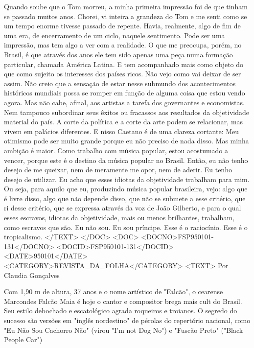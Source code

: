 Quando soube que o Tom morreu, a minha primeira impressão foi de que tinham se passado muitos anos. Chorei, vi inteira a grandeza do Tom e me senti como se um tempo enorme tivesse passado de repente. Havia, realmente, algo de fim de uma era, de encerramento de um ciclo, naquele sentimento. Pode ser uma impressão, mas tem algo a ver com a realidade.
O que me preocupa, porém, no Brasil, é que através dos anos ele tem sido apenas uma peça numa formação particular, chamada América Latina. E tem acompanhado mais como objeto do que como sujeito os interesses dos países ricos. Não vejo como vai deixar de ser assim. Não creio que a sensação de estar nesse submundo dos acontecimentos históricos mundiais possa se romper em função de alguma coisa que estou vendo agora.
Mas não cabe, afinal, aos artistas a tarefa dos governantes e economistas. Nem tampouco subordinar seus êxitos ou fracassos aos resultados da objetividade material do país. A corte da política e a corte da arte podem se relacionar, mas vivem em palácios diferentes. E nisso Caetano é de uma clareza cortante:
Meu otimismo pode ser muito grande porque eu não preciso de nada disso. Mas minha ambição é maior. Como trabalho com música popular, estou acostumado a vencer, porque este é o destino da música popular no Brasil. Então, eu não tenho desejo de me queixar, nem de meramente me opor, nem de aderir.
Eu tenho desejo de utilizar. Eu acho que esses idiotas da objetividade trabalham para mim. Ou seja, para aquilo que eu, produzindo música popular brasileira, vejo: algo que é livre disso, algo que não depende disso, que não se submete a esse critério, que ri desse critério, que se expressa através da voz de João Gilberto, e para o qual esses escravos, idiotas da objetividade, mais ou menos brilhantes, trabalham, como escravos que são. Eu não sou. Eu sou príncipe. Esse é o raciocínio. Esse é o tropicalismo.
</TEXT>
</DOC>
<DOC>
<DOCNO>FSP950101-131</DOCNO>
<DOCID>FSP950101-131</DOCID>
<DATE>950101</DATE>
<CATEGORY>REVISTA_DA_FOLHA</CATEGORY>
<TEXT>
Por Claudia Gonçalves

Com 1,90 m de altura, 37 anos e o nome artístico de "Falcão", o cearense Marcondes Falcão Maia é hoje o cantor e compositor brega mais cult do Brasil. Seu estilo debochado e escatológico agrada roqueiros e troianos. O segredo do sucesso são versões em "inglês nordestino" de pérolas do repertório nacional, como "Eu Não Sou Cachorro Não" (virou "I'm not Dog No") e "Fuscão Preto" ("Black People Car")

